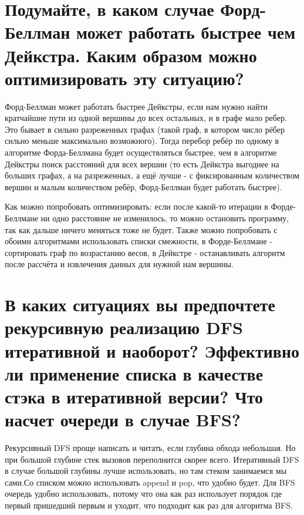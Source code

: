 \documentclass[12pt]{article}
\begin{document}
\section{Подумайте, в каком случае Форд-Беллман может работать быстрее чем Дейкстра. Каким образом можно оптимизировать эту ситуацию?}
Форд-Беллман может работать быстрее Дейкстры, если нам нужно найти кратчайшие пути из одной вершины до всех остальных, и в графе мало ребер. Это бывает в сильно разреженных графах (такой граф, в котором число рёбер сильно меньше максимально возможного). Тогда перебор ребёр по одному в алгоритме Форда-Беллмана будет осуществляться быстрее, чем в алгоритме Дейкстры поиск расстояний для всех вершин (то есть Дейкстра выгоднее на больших графах, а на разреженных, а ещё лучше - с фиксированным количеством вершин и малым количеством ребёр, Форд-Беллман будет работать быстрее).

Как можно попробовать оптимизировать: если после какой-то итерации в Форде-Беллмане ни одно расстояние не изменилось, то можно остановить программу, так как дальше ничего меняться тоже не будет. Также можно попробовать с обоими алгоритмами использовать списки смежности, в Форде-Беллмане - сортировать граф по возрастанию весов, в Дейкстре - останавливать алгоритм после рассчёта и извлечения данных для нужной нам вершины. 

\section{В каких ситуациях вы предпочтете рекурсивную реализацию DFS итеративной и наоборот? Эффективно ли применение списка в качестве стэка в итеративной версии? Что насчет очереди в случае BFS?}
Рекурсивный DFS проще написать и читать, если глубина обхода небольшая. Но при большой глубине стек вызовов переполнится скорее всего. Итеративный DFS в случае большой глубины лучше использовать, но там стеком занимаемся мы сами.Со списком можно использовать append и pop, что удобно будет.
Для BFS очередь удобно использовать, потому что она как раз использует порядок где первый пришедший первым и уходит, что подходит как раз для алгоритма BFS.
\end{document}
